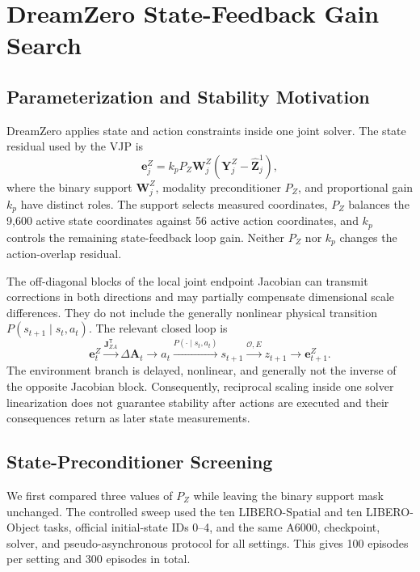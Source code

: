 
\section{DreamZero State-Feedback Gain Search}
\label{app:dreamzero-gain-search}

\subsection{Parameterization and Stability Motivation}

DreamZero applies state and action constraints inside one joint solver. The
state residual used by the VJP is
\begin{equation}
    \mathbf e_j^Z
    =k_p P_Z\mathbf W_j^Z
    (\mathbf Y_j^Z-\hat{\mathbf Z}_j^1),
\end{equation}
where the binary support $\mathbf W_j^Z$, modality preconditioner $P_Z$, and
proportional gain $k_p$ have distinct roles. The support selects measured
coordinates, $P_Z$ balances the 9,600 active state coordinates against 56
active action coordinates, and $k_p$ controls the remaining state-feedback
loop gain. Neither $P_Z$ nor $k_p$ changes the action-overlap residual.

The off-diagonal blocks of the local joint endpoint Jacobian can transmit
corrections in both directions and may partially compensate dimensional scale
differences. They do not include the generally nonlinear physical transition
$P(s_{t+1}\mid s_t,a_t)$. The relevant closed loop is
\begin{equation}
    \mathbf e_t^Z
    \xrightarrow{\mathbf J_{ZA}^{\mathsf T}}
    \Delta\mathbf A_t
    \longrightarrow a_t
    \xrightarrow{P(\cdot\mid s_t,a_t)}
    s_{t+1}
    \xrightarrow{\mathcal O,E}
    z_{t+1}
    \longrightarrow \mathbf e_{t+1}^Z.
    \label{eq:closed-loop-state-feedback}
\end{equation}
The environment branch is delayed, nonlinear, and generally not the inverse of
the opposite Jacobian block. Consequently, reciprocal scaling inside one solver
linearization does not guarantee stability after actions are executed and their
consequences return as later state measurements.

\subsection{State-Preconditioner Screening}

We first compared three values of $P_Z$ while leaving the binary support mask
unchanged. The controlled sweep used the ten LIBERO-Spatial and ten
LIBERO-Object tasks, official initial-state IDs 0--4, and the same A6000,
checkpoint, solver, and pseudo-asynchronous protocol for all settings. This
gives 100 episodes per setting and 300 episodes in total.

